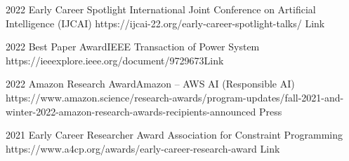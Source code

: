 \begin{awards}
	\awardentry
	{2022}
	{Early Career Spotlight}%
	{International Joint Conference on Artificial Intelligence (IJCAI)}
	{https://ijcai-22.org/early-career-spotlight-talks/}
	{Link}

	\awardentry
	{2022}
	{Best Paper Award}{IEEE Transaction of Power System}
	{https://ieeexplore.ieee.org/document/9729673}{Link}

	\awardentry
	{2022}
	{Amazon Research Award}{Amazon -- AWS AI (Responsible AI)}
	{https://www.amazon.science/research-awards/program-updates/fall-2021-and-winter-2022-amazon-research-awards-recipients-announced}%
	{Press}

	\awardentry
	{2021}
	{Early Career Researcher Award}
	{Association for Constraint Programming}
	{https://www.a4cp.org/awards/early-career-research-award}
	{Link}


\end{awards}
